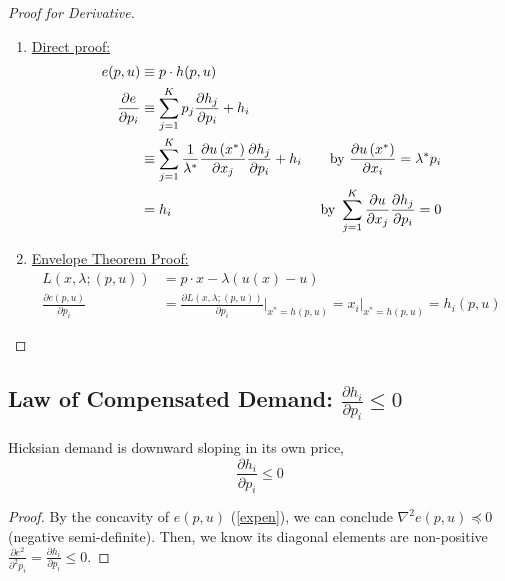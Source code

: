\documentclass[11pt]{elegantbook}
\begin{document}
\begin{proof}[Proof for Derivative]
    \begin{enumerate}
        \item \underline{Direct proof:}
        $$
        \begin{aligned}
        e(p, u) & \equiv p \cdot h(p, u)& \\
        \frac{\partial e}{\partial p_{i}} & \equiv \sum_{j=1}^{K} p_{j} \frac{\partial h_{j}}{\partial p_{i}}+h_{i}& \\
        & \equiv \sum_{j=1}^{K} \frac{1}{\lambda^{*}} \frac{\partial u\left(x^{*}\right)}{\partial x_{j}} \frac{\partial h_{j}}{\partial p_{i}}+h_{i}& \textnormal{ by }\frac{\partial u\left(x^{*}\right)}{\partial x_{i}}=\lambda^{*} p_{i}\\
        &=h_i&\textnormal{ by }\sum_{j=1}^{K} \frac{\partial u}{\partial x_j} \frac{\partial h_{j}}{\partial p_{i}}=0
        \end{aligned}
        $$
        \item \underline{Envelope Theorem Proof:}
        \begin{equation}
            \begin{aligned}
                L(x,\lambda;(p,u))&=p\cdot x-\lambda (u(x)-u)\\
                \frac{\partial e(p,u)}{\partial p_i}&=\frac{\partial L(x,\lambda;(p,u))}{\partial p_i}\bigg|_{x^*=h(p,u)}=x_i|_{x^*=h(p,u)}=h_i(p,u)
            \end{aligned}
            \nonumber
        \end{equation}
    \end{enumerate}
\end{proof}

\subsection{Law of Compensated Demand: $\frac{\partial h_i}{\partial p_i}\leq 0$}
\begin{corollary}
    Hicksian demand is downward sloping in its own price, $$\frac{\partial h_i}{\partial p_i}\leq 0$$
\end{corollary}
\begin{proof}
    By the concavity of $e(p,u)$ (\ref{expen}), we can conclude $\nabla^2 e(p,u)\preceq 0$ (negative semi-definite). Then, we know its diagonal elements are non-positive $\frac{\partial e^2}{\partial^2 p_i}=\frac{\partial h_i}{\partial p_i}\leq 0$.
\end{proof}
\end{document}
